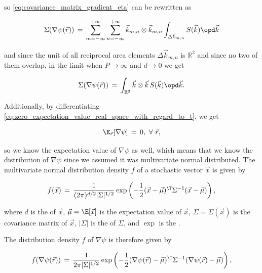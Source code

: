 so \eqref{eq:covariance_matrix_gradient_eta} can be rewritten as

\begin{equation}
\Sigma(\nabla\psi(\vec{r})) \,=\, \sum_{m=-\infty}^{+\infty}\sum_{n=-\infty}^{+\infty}\vec{k}_{m,n}\otimes\vec{k}_{m,n} \int_{\Delta\vec{k}_{m,n}}S(\vec{k})\opd\vec{k}
\end{equation}

and since the unit of all reciprocal area elements $\Delta\vec{k}_{m,n}$ is $\mathbb{R}^2$ and since no two of them overlap, in the limit when $P\to\infty$ and $d\to 0$ we get

\begin{equation} \label{eq:covariance_matrix_gradient_eta_final}
\Sigma(\nabla\psi(\vec{r})) \,=\, \int_{\mathbb{R}^2}\vec{k}\otimes\vec{k}\,S(\vec{k})\opd\vec{k}.
\end{equation}

Additionally, by differentiating \eqref{eq:zero_expectation_value_real_space_with_regard_to_t}, we get

\begin{equation} \label{eq:psi_of_r_expectation_value}
\E_{\vec{r}}[\nabla\psi] \,=\, 0,\ \forall\ \vec{r},
\end{equation}

so we know the expectation value of $\nabla\psi$ as well, which means that we know the distribution of $\nabla\psi$ since we assumed it was multivariate normal distributed. The multivariate normal distribution density $f$ of a stochastic vector $\vec{x}$ is given by

\begin{equation} \label{eq:multivariate_normal_distribution_density}
f(\vec{x}) \,=\, \frac{1}{(2\pi)^{d/2}|\Sigma|^{1/2}}\exp\left(-\frac{1}{2}(\vec{x}-\vec{\mu})^{\T}\Sigma^{-1}(\vec{x}-\vec{\mu})\right),
\end{equation}

where $d$ is the \dimensionality of $\vec{x}$, $\vec{\mu} = \E[\vec{x}]$ is the expectation value of $\vec{x}$, $\Sigma = \Sigma(\vec{x})$ is the covariance matrix of $\vec{x}$, $|\Sigma|$ is the \determinant of $\Sigma$, and $\exp$ is the .

The distribution density $f$ of $\nabla\psi$ is therefore given by

\begin{equation} \label{eq:psi_grad_distribution}
f(\nabla\psi(\vec{r})) \,=\, \frac{1}{2\pi|\Sigma|^{1/2}}\exp\left(-\frac{1}{2}(\nabla\psi(\vec{r})-\vec{\mu})^{\T}\Sigma^{-1}(\nabla\psi(\vec{r})-\vec{\mu})\right),
\end{equation}

